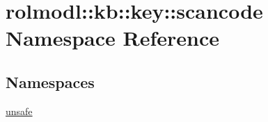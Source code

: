 \hypertarget{namespacerolmodl_1_1kb_1_1key_1_1scancode}{}\section{rolmodl\+::kb\+::key\+::scancode Namespace Reference}
\label{namespacerolmodl_1_1kb_1_1key_1_1scancode}
\subsection*{Namespaces}
\begin{DoxyCompactItemize}
\item 
 \mbox{\hyperlink{namespacerolmodl_1_1kb_1_1key_1_1scancode_1_1unsafe}{unsafe}}
\end{DoxyCompactItemize}
